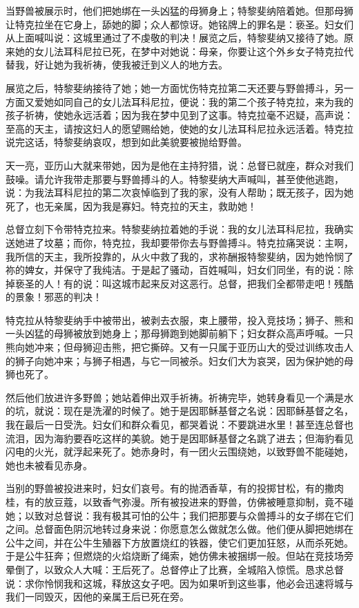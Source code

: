 当野兽被展示时，他们把她绑在一头凶猛的母狮身上；特黎斐纳陪着她。但那母狮让特克拉坐在它身上，舔她的脚；众人都惊讶。她铭牌上的罪名是：亵圣。妇女们从上面喊叫说：这城里通过了不虔敬的判决！展览之后，特黎斐纳又接待了她。原来她的女儿法耳科尼拉已死，在梦中对她说：母亲，你要让这个外乡女子特克拉代替我，好让她为我祈祷，使我被迁到义人的地方去。\par

展览之后，特黎斐纳接待了她；她一方面忧伤特克拉第二天还要与野兽搏斗，另一方面又爱她如同自己的女儿法耳科尼拉，便说：我的第二个孩子特克拉，来为我的孩子祈祷，使她永远活着；因为我在梦中见到了这事。特克拉毫不迟疑，高声说：至高的天主，请按这妇人的愿望赐给她，使她的女儿法耳科尼拉永远活着。特克拉说完这话，特黎斐纳哀叹，想到如此美貌要被抛给野兽。\par

天一亮，亚历山大就来带她，因为是他在主持狩猎，说：总督已就座，群众对我们鼓噪。请允许我带走那要与野兽搏斗的人。特黎斐纳大声喊叫，甚至使他逃跑，说：为我法耳科尼拉的第二次哀悼临到了我的家，没有人帮助；既无孩子，因为她死了，也无亲属，因为我是寡妇。特克拉的天主，救助她！\par

总督立刻下令带特克拉来。特黎斐纳拉着她的手说：我的女儿法耳科尼拉，我确实送她进了坟墓；而你，特克拉，我却要带你去与野兽搏斗。特克拉痛哭说：主啊，我所信的天主，我所投靠的，从火中救了我的，求祢酬报特黎斐纳，因为她怜悯了祢的婢女，并保守了我纯洁。于是起了骚动，百姓喊叫，妇女们同坐，有的说：除掉亵圣的人！有的说：叫这城市起来反对这恶行。总督，把我们全都带走吧！残酷的景象！邪恶的判决！\par

特克拉从特黎斐纳手中被带出，被剥去衣服，束上腰带，投入竞技场；狮子、熊和一头凶猛的母狮被放到她身上；那母狮跑到她脚前躺下；妇女群众高声呼喊。一只熊向她冲来；但母狮迎击熊，把它撕碎。又有一只属于亚历山大的受过训练攻击人的狮子向她冲来；与狮子相遇，与它一同被杀。妇女们大为哀哭，因为保护她的母狮也死了。\par

然后他们放进许多野兽；她站着伸出双手祈祷。祈祷完毕，她转身看见一个满是水的坑，就说：现在是洗濯的时候了。她于是因耶稣基督之名说：因耶稣基督之名，我在最后一日受洗。妇女们和群众看见，都哭着说：不要跳进水里！甚至连总督也流泪，因为海豹要吞吃这样的美貌。她于是因耶稣基督之名跳了进去；但海豹看见闪电的火光，就浮起来死了。她赤身时，有一团火云围绕她，以致野兽不能碰她，她也未被看见赤身。\par

当别的野兽被投进来时，妇女们哀号。有的抛洒香草，有的投掷甘松，有的撒肉桂，有的放豆蔻，以致香气弥漫。所有被投进来的野兽，仿佛被睡意抑制，竟不碰她；以致对总督说：我有极其可怕的公牛；我们把那要与众兽搏斗的女子绑在它们之间。总督面色阴沉地转过身来说：你愿意怎么做就怎么做。他们便从脚把她绑在公牛之间，并在公牛生殖器下方放置烧红的铁器，使它们更加狂怒，从而杀死她。于是公牛狂奔；但燃烧的火焰烧断了绳索，她仿佛未被捆绑一般。但站在竞技场旁晕倒了，以致众人大喊：王后死了。总督停止了比赛，全城陷入惊慌。恳求总督说：求你怜悯我和这城，释放这女子吧。因为如果听到这些事，他必会迅速将城与我们一同毁灭，因他的亲属王后已死在旁。\par

